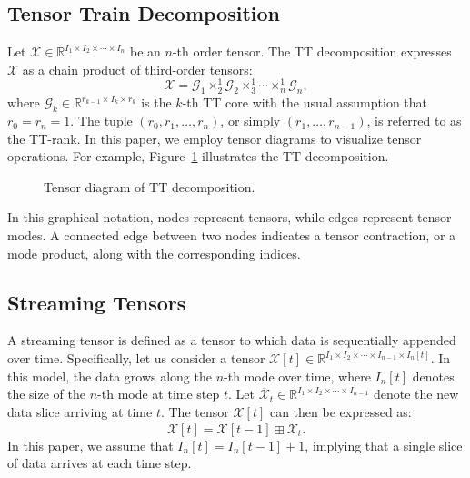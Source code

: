 \documentclass[a4paper, 11pt]{article}
\newcommand{\ttimes}[2]{\times_{#1}^{#2}}
\theoremstyle{plain}
\theoremstyle{definition}
\theoremstyle{remark}
\begin{document}
\subsection{Tensor Train Decomposition}
Let $\mathcal{X} \in \mathbb{R}^{I_1 \times I_2 \times \cdots \times I_n}$ be an $n$-th order tensor.
The TT decomposition expresses $\mathcal{X}$ as a chain product of third-order tensors: 
\begin{equation*}
\mathcal{X} = \mathcal{G}_1 \ttimes{2}{1} \mathcal{G}_2 \ttimes{3}{1} \cdots \ttimes{n}{1} \mathcal{G}_n,
\end{equation*}
where $\mathcal{G}_k \in \mathbb{R}^{r_{k-1} \times I_k \times r_k}$ is the $k$-th TT core with the usual assumption that $r_0 = r_n = 1$.
The tuple $(r_0, r_1, \ldots, r_n)$, or simply $(r_1, \ldots, r_{n-1})$, is referred to as the TT-rank.
In this paper, we employ tensor diagrams to visualize tensor operations.
For example, Figure~\ref{fig:tensor-diagram-ttd} illustrates the TT decomposition.
\begin{figure}[t]
\centering
{}
\caption{Tensor diagram of TT decomposition.}
\label{fig:tensor-diagram-ttd}
\end{figure}
In this graphical notation, nodes represent tensors, while edges represent tensor modes.
A connected edge between two nodes indicates a tensor contraction, or a mode product, along with the corresponding indices.

\subsection{Streaming Tensors}
A streaming tensor is defined as a tensor to which data is sequentially appended over time.
Specifically, let us consider a tensor $\mathcal{X}[t] \in \mathbb{R}^{I_1 \times I_2 \times \cdots \times I_{n-1} \times I_n[t]}$.
In this model, the data grows along the $n$-th mode over time, where $I_n[t]$ denotes the size of the $n$-th mode at time step $t$.
Let $\overline{\mathcal{X}}_t \in \mathbb{R}^{I_1 \times I_2 \times \cdots \times I_{n-1}}$ denote the new data slice arriving at time $t$.
The tensor $\mathcal{X}[t]$ can then be expressed as:
\begin{equation*}
\mathcal{X}[t] = \mathcal{X}[t-1] \boxplus \overline{\mathcal{X}}_t.
\end{equation*}
In this paper, we assume that $I_n[t] = I_n[t-1] + 1$, implying that a single slice of data arrives at each time step.
\end{document}
